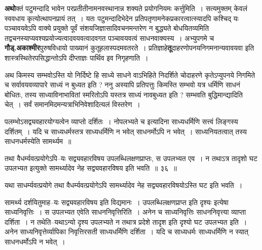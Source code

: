 \documentclass[article,12pt,a4paper]{memoir}
\begin{document}
	  \pstart \textbf{अथो}क्तं पटुमन्दादि भावेन परप्रतीतीनामनवस्थानान्न शक्यते प्रयोगनियमः कर्त्तुमिति । सत्यमुक्तम्\leavevmode{} केवलं स्ववधाय कृत्योत्थापनप्रायं तत् । यतः पटुमन्दादिभेदेन प्रतिपतृणामनेकप्रकारत्वात्स्यादपि कश्चिद् यः पञ्चावयवेऽपि वाक्ये प्रयुक्ते पूर्वं संशयजिज्ञासादिवचनमन्तरेण न बुद्ध्यते बोधयितव्यमिति तद्वचनस्याप्यवश्यप्रयोज्यत्वादवयवत्वादवगत पञ्चावयवत्वं साधनवाक्यस्य । अभ्युपगमे च \textbf{गौड्.अकाश्मीर}पुरुषविधायो पाख्यानं कुतूहलास्पदमवतरते । प्रतिज्ञाहे\textbf{तू}दाहरणोपनयनिगमनान्यवावयवा इति शास्त्रस्थितेरपसिद्धान्तोऽपि दीप्ताज्ञः पार्थिव इव निगृहणाति ।
	\pend
      

	  \pstart अथ किमस्य सम्भवोऽस्ति यो निर्दिष्टे हि साध्ये साधने वाऽभिहिते निदर्शिते चोदाहरणे कृतेऽप्युपनये निगमिते च सर्वावयवव्यापारे साध्यं न बुध्यत इति ? ननु अस्यापि प्रतिपत्तुः किमस्ति सम्भवो यत्र धर्मिणि साधनं बोधितः, तस्य साध्याविनाभावितां स्मरितोऽपि यस्तत्र साध्यं नावबुध्यत इति ? सम्भवति बुद्धिमान्द्यादिति चेत् । सर्वं समानमिदमन्यत्राभिनिवेशादित्यलं विस्तरेण ।
	\pend
	  \bigskip
	  \begingroup
	

	  \pstart पलम्भोऽसद्व्यवहारयोग्यत्वेन व्याप्तो दर्शितः । नोपलभ्यते च इत्यादिना साध्यधर्मिणि सत्त्वं लिङ्गस्य दर्शितम् । यदि च साध्यधर्मस्तत्र साध्यधर्मिणि न भवेत् साधनर्मोऽपि न भवेत् । साध्यनियतत्वात् तस्य साधनधर्मस्येति सामर्थ्यम ॥
	\pend
        
	  \bigskip
	  \begingroup
	

	  \pstart तथा वैधर्म्यवत्प्रयोगेऽपि--यः सद्व्यवहारविषय उपलब्धिलक्षणप्राप्तः, स उपलभ्यत एव । न तथाऽत्र तादृशो घट उपलभ्यत इत्युक्ते सामर्थ्यादेव नेह सद्व्यवहारविषय इति भवति ॥ ३६ ॥
	\pend
      
	  \endgroup
	 

	  \pstart यथा साधर्म्यवत्प्रयोगे तथा वैधर्म्यवत्प्रयोगेऽपि सामर्थ्यादेव नेह सद्व्यवहारविषयोऽस्ति घट इति भवति ।
	\pend
        

	  \pstart सामर्थ्य दर्शयितुमाह--यः सद्व्यवहारविषय इति विद्यमानः । उपलब्धिलक्षणप्राप्त इति दृश्यः इत्येषा साध्यनिवृत्तिः । स उपलभ्यत एवेति साधननिवृत्तिरिति । अनेन च साध्यनिवृत्तिः साधननिवृत्त्या व्याप्ता दर्शिता । न तथेति--यथाऽन्यो दृश्य उपलभ्यते न तथात्र प्रदेशे तादृश इति दृश्यो घट उपलभ्यत इति । अनेन साध्यनिवृत्तेर्व्यापिका निवृत्तिरसती साध्यधर्मिणि दर्शिता । यदि च साध्यधर्मः साध्यधर्मिणि न स्यात् साधनधर्मोऽपि न भवेत् ।
	\pend
      
\end{document}
